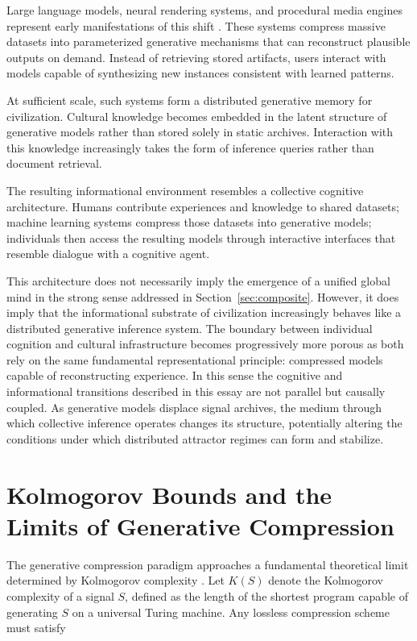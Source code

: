 \documentclass[12pt,a4paper]{article}
\theoremstyle{plain}
\theoremstyle{definition}
\begin{document}
Large language models, neural rendering systems, and procedural media engines represent early manifestations of this shift \cite{VandenOord2016,Mildenhall2020,Vaswani2017}. These systems compress massive datasets into parameterized generative mechanisms that can reconstruct plausible outputs on demand. Instead of retrieving stored artifacts, users interact with models capable of synthesizing new instances consistent with learned patterns.

At sufficient scale, such systems form a distributed generative memory for civilization. Cultural knowledge becomes embedded in the latent structure of generative models rather than stored solely in static archives. Interaction with this knowledge increasingly takes the form of inference queries rather than document retrieval.

The resulting informational environment resembles a collective cognitive architecture. Humans contribute experiences and knowledge to shared datasets; machine learning systems compress those datasets into generative models; individuals then access the resulting models through interactive interfaces that resemble dialogue with a cognitive agent.

This architecture does not necessarily imply the emergence of a unified global mind in the strong sense addressed in Section~\ref{sec:composite}. However, it does imply that the informational substrate of civilization increasingly behaves like a distributed generative inference system. The boundary between individual cognition and cultural infrastructure becomes progressively more porous as both rely on the same fundamental representational principle: compressed models capable of reconstructing experience. In this sense the cognitive and informational transitions described in this essay are not parallel but causally coupled. As generative models displace signal archives, the medium through which collective inference operates changes its structure, potentially altering the conditions under which distributed attractor regimes can form and stabilize.

\section{Kolmogorov Bounds and the Limits of Generative Compression}
\label{sec:kolmogorov}

The generative compression paradigm approaches a fundamental theoretical limit determined by Kolmogorov complexity \cite{Kolmogorov1965,Solomonoff1964}. Let $K(S)$ denote the Kolmogorov complexity of a signal $S$, defined as the length of the shortest program capable of generating $S$ on a universal Turing machine. Any lossless compression scheme must satisfy
\end{document}
